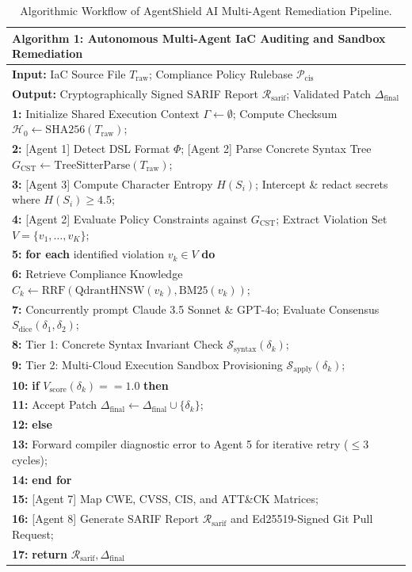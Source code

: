 \documentclass[runningheads]{llncs}
\begin{document}
\begin{table}[t]
\centering
\caption{Algorithmic Workflow of AgentShield AI Multi-Agent Remediation Pipeline.}
\label{tab:algorithm}
\begin{tabular}{|p{}|}
\hline
\textbf{Algorithm 1: Autonomous Multi-Agent IaC Auditing and Sandbox Remediation} \\
\hline
\textbf{Input:} IaC Source File $T_{\mathrm{raw}}$; Compliance Policy Rulebase $\mathcal{P}_{\mathrm{cis}}$ \\
\textbf{Output:} Cryptographically Signed SARIF Report $\mathcal{R}_{\mathrm{sarif}}$; Validated Patch $\Delta_{\mathrm{final}}$ \\
\textbf{1:} Initialize Shared Execution Context $\Gamma \leftarrow \emptyset$; Compute Checksum $\mathcal{H}_0 \leftarrow \mathrm{SHA256}(T_{\mathrm{raw}})$; \\
\textbf{2:} [Agent 1] Detect DSL Format $\Phi$; [Agent 2] Parse Concrete Syntax Tree $G_{\mathrm{CST}} \leftarrow \mathrm{TreeSitterParse}(T_{\mathrm{raw}})$; \\
\textbf{3:} [Agent 3] Compute Character Entropy $H(S_i)$; Intercept \& redact secrets where $H(S_i) \ge 4.5$; \\
\textbf{4:} [Agent 2] Evaluate Policy Constraints against $G_{\mathrm{CST}}$; Extract Violation Set $V = \{v_1, \dots, v_K\}$; \\
\textbf{5:} \textbf{for each} identified violation $v_k \in V$ \textbf{do} \\
\textbf{6:} \quad [Agent 4] Retrieve Compliance Knowledge $C_k \leftarrow \mathrm{RRF}(\mathrm{QdrantHNSW}(v_k), \mathrm{BM25}(v_k))$; \\
\textbf{7:} \quad [Agent 5] Concurrently prompt Claude 3.5 Sonnet \& GPT-4o; Evaluate Consensus $S_{\mathrm{dice}}(\delta_1, \delta_2)$; \\
\textbf{8:} \quad [Agent 6] Tier 1: Concrete Syntax Invariant Check $\mathcal{S}_{\mathrm{syntax}}(\delta_k)$; \\
\textbf{9:} \quad [Agent 6] Tier 2: Multi-Cloud Execution Sandbox Provisioning $\mathcal{S}_{\mathrm{apply}}(\delta_k)$; \\
\textbf{10:} \quad \textbf{if} $V_{\mathrm{score}}(\delta_k) == 1.0$ \textbf{then} \\
\textbf{11:} \qquad Accept Patch $\Delta_{\mathrm{final}} \leftarrow \Delta_{\mathrm{final}} \cup \{\delta_k\}$; \\
\textbf{12:} \quad \textbf{else} \\
\textbf{13:} \qquad Forward compiler diagnostic error to Agent 5 for iterative retry ($\le 3$ cycles); \\
\textbf{14:} \textbf{end for} \\
\textbf{15:} [Agent 7] Map CWE, CVSS, CIS, and ATT\&CK Matrices; \\
\textbf{16:} [Agent 8] Generate SARIF Report $\mathcal{R}_{\mathrm{sarif}}$ and Ed25519-Signed Git Pull Request; \\
\textbf{17:} \textbf{return} $\mathcal{R}_{\mathrm{sarif}}, \Delta_{\mathrm{final}}$ \\
\hline
\end{tabular}
\end{table}
\end{document}
